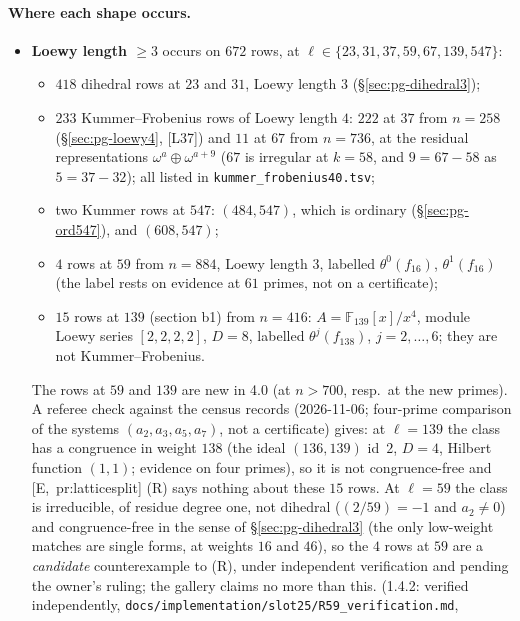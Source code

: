 \documentclass[11pt]{article}
\newcommand{\F}{\mathbb{F}}
\newcommand{\pfile}[1]{\nolinkurl{#1}}
\begin{document}
\paragraph{Where each shape occurs.}
\begin{itemize}[leftmargin=1.6em,itemsep=1pt]
\item \textbf{Loewy length $\ge3$} occurs on $672$ rows, at $\ell\in\{23,31,37,59,67,139,547\}$:
  \begin{itemize}[itemsep=0pt]
  \item $418$ dihedral rows at $23$ and $31$, Loewy length $3$ (\S\ref{sec:pg-dihedral3});
  \item $233$ Kummer--Frobenius rows of Loewy length $4$: $222$ at $37$ from $n=258$ (\S\ref{sec:pg-loewy4}, [L37]) and $11$ at $67$ from
    $n=736$, at the residual representations $\omega^{a}\oplus\omega^{a+9}$ ($67$ is irregular at $k=58$, and $9=67-58$ as $5=37-32$); all
    listed in \pfile{kummer_frobenius40.tsv};
  \item two Kummer rows at $547$: $(484,547)$, which is ordinary (\S\ref{sec:pg-ord547}), and $(608,547)$;
  \item $4$ rows at $59$ from $n=884$, Loewy length $3$, labelled $\theta^{0}(f_{16})$, $\theta^{1}(f_{16})$ (the label rests on evidence at
    $61$ primes, not on a certificate);
  \item $15$ rows at $139$ (section b1) from $n=416$: $A=\F_{139}[x]/x^{4}$, module Loewy series $[2,2,2,2]$, $D=8$, labelled
    $\theta^{j}(f_{138})$, $j=2,\dots,6$; they are not Kummer--Frobenius.
  \end{itemize}
  The rows at $59$ and $139$ are new in 4.0 (at $n>700$, resp.\ at the new primes). A referee check against the census records
  (2026-11-06; four-prime comparison of the systems $(a_2,a_3,a_5,a_7)$, not a certificate) gives: at $\ell=139$ the class has a congruence in
  weight $138$ (the ideal $(136,139)$ id~$2$, $D=4$, Hilbert function $(1,1)$; evidence on four primes), so it is not congruence-free and
  [E,~pr:latticesplit] (R) says nothing about these $15$ rows. At $\ell=59$ the class is irreducible, of residue degree one, not dihedral
  ($(2/59)=-1$ and $a_2\ne0$) and congruence-free in the sense of \S\ref{sec:pg-dihedral3} (the only low-weight matches are single forms, at
  weights $16$ and $46$), so the $4$ rows at $59$ are a \emph{candidate} counterexample to (R), under independent verification and pending the
  owner's ruling; the gallery claims no more than this. (1.4.2: verified independently, \pfile{docs/implementation/slot25/R59_verification.md},

\end{itemize}
\end{document}
